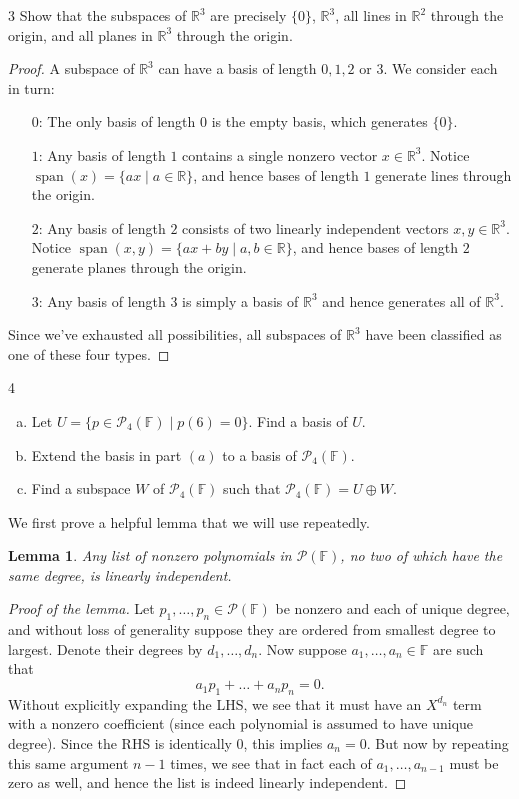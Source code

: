 \documentclass{extarticle}
\newenvironment{problem}[1]{\begin{prob*}{#1}{}}{\end{prob*}}
\newtheorem{lemma}[thm]{Lemma}
\newcommand{\R}{\mathbb{R}}
\newcommand{\F}{\mathbb{F}}
\DeclareMathOperator{\Span}{span}
\begin{document}
\begin{problem}{3}
Show that the subspaces of $\R^3$ are precisely $\{0\}$, $\R^3$, all lines in $\R^2$ through the origin, and all planes in $\R^3$ through the origin.
\end{problem}
\begin{proof}
A subspace of $\R^3$ can have a basis of length $0,1,2$ or $3$.  We consider each in turn:
\begin{itemize}
\item[$0$:] The only basis of length $0$ is the empty basis, which generates $\{0\}$.
\item[$1$:] Any basis of length $1$ contains a single nonzero vector $x\in\R^3$.  Notice $\Span(x)=\{ax\mid a\in\R\}$, and hence bases of length $1$ generate lines through the origin.
\item[$2$:] Any basis of length $2$ consists of two linearly independent vectors $x,y\in\R^3$.  Notice $\Span(x,y)=\{ax + by\mid a,b\in\R\}$, and hence bases of length $2$ generate planes through the origin.
\item[$3$:] Any basis of length $3$ is simply a basis of $\R^3$ and hence generates all of $\R^3$.
\end{itemize}
Since we've exhausted all possibilities, all subspaces of $\R^3$ have been classified as one of these four types.
\end{proof}

\begin{problem}{4}
\begin{enumerate}[(a)]
\item Let $U=\{p\in\mathcal{P}_4(\F)\mid p(6) = 0\}$.  Find a basis of $U$.
\item Extend the basis in part $(a)$ to a basis of $\mathcal{P}_4(\F)$.
\item Find a subspace $W$ of $\mathcal{P}_4(\F)$ such that $\mathcal{P}_4(\F)=U\oplus W$.
\end{enumerate}
\end{problem}
\noindent We first prove a helpful lemma that we will use repeatedly.
\begin{lemma}
Any list of nonzero polynomials in $\mathcal{P}(\F)$, no two of which have the same degree, is linearly independent.
\end{lemma}
\begin{proof}[Proof of the lemma]
Let $p_1,\dots, p_n\in\mathcal{P}(\F)$ be nonzero and each of unique degree, and without loss of generality suppose they are ordered from smallest degree to largest.  Denote their degrees by $d_1,\dots,d_n$.  Now suppose $a_1,\dots, a_n\in\F$ are such that
\begin{equation*}
a_1p_1 + \dots + a_np_n = 0.
\end{equation*}
Without explicitly expanding the LHS, we see that it must have an $X^{d_n}$ term with a nonzero coefficient (since each polynomial is assumed to have unique degree).  Since the RHS is identically $0$, this implies $a_n=0$.  But now by repeating this same argument $n-1$ times, we see that in fact each of $a_1,\dots,a_{n-1}$ must be zero as well, and hence the list is indeed linearly independent.
\end{proof}
\end{document}
